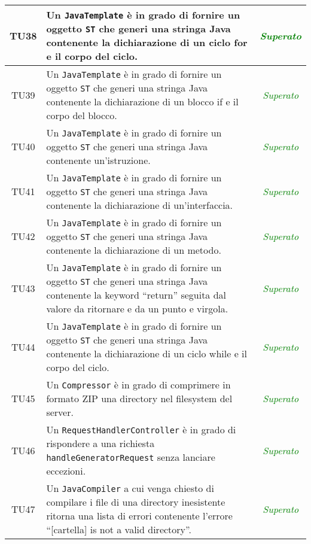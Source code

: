 \begin{longtable}{|c|>{}m{8cm}|c|}
\hypertarget{TU38}{TU38} & Un \texttt{JavaTemplate} è in grado di fornire un oggetto \texttt{ST} che generi una stringa Java contenente la dichiarazione di un ciclo for e il corpo del ciclo. & \textcolor{Green}{\textit{Superato}}\\ \hline
\hypertarget{TU39}{TU39} & Un \texttt{JavaTemplate} è in grado di fornire un oggetto \texttt{ST} che generi una stringa Java contenente la dichiarazione di un blocco if e il corpo del blocco. & \textcolor{Green}{\textit{Superato}}\\ \hline
\hypertarget{TU40}{TU40} & Un \texttt{JavaTemplate} è in grado di fornire un oggetto \texttt{ST} che generi una stringa Java contenente un'istruzione. & \textcolor{Green}{\textit{Superato}}\\ \hline
\hypertarget{TU41}{TU41} & Un \texttt{JavaTemplate} è in grado di fornire un oggetto \texttt{ST} che generi una stringa Java contenente la dichiarazione di un'interfaccia. & \textcolor{Green}{\textit{Superato}}\\ \hline
\hypertarget{TU42}{TU42} & Un \texttt{JavaTemplate} è in grado di fornire un oggetto \texttt{ST} che generi una stringa Java contenente la dichiarazione di un metodo. & \textcolor{Green}{\textit{Superato}}\\ \hline
\hypertarget{TU43}{TU43} & Un \texttt{JavaTemplate} è in grado di fornire un oggetto \texttt{ST} che generi una stringa Java contenente la keyword ``return'' seguita dal valore da ritornare e da un punto e virgola. & \textcolor{Green}{\textit{Superato}}\\ \hline
\hypertarget{TU44}{TU44} & Un \texttt{JavaTemplate} è in grado di fornire un oggetto \texttt{ST} che generi una stringa Java contenente la dichiarazione di un ciclo while e il corpo del ciclo. & \textcolor{Green}{\textit{Superato}}\\ \hline
\hypertarget{TU45}{TU45} & Un \texttt{Compressor} è in grado di comprimere in formato ZIP una directory nel filesystem del server. & \textcolor{Green}{\textit{Superato}}\\ \hline
\hypertarget{TU46}{TU46} & Un \texttt{RequestHandlerController} è in grado di rispondere a una richiesta \texttt{handleGeneratorRequest} senza lanciare eccezioni. & \textcolor{Green}{\textit{Superato}}\\ \hline
\hypertarget{TU47}{TU47} & Un \texttt{JavaCompiler} a cui venga chiesto di compilare i file di una directory inesistente ritorna una lista di errori contenente l'errore ``[cartella] is not a valid directory''. & \textcolor{Green}{\textit{Superato}}\\ \hline

\end{longtable}
